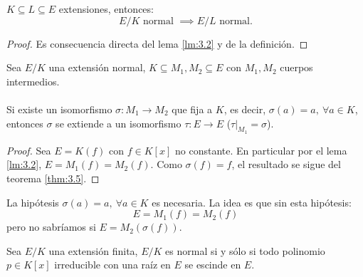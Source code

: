 

\begin{lm}\label{lm:3.7}
    $K \subseteq L \subseteq E$ extensiones, entonces:
    $$
        E/K \text{ normal } \implies E/L \text{ normal.}
    $$
\end{lm}

\begin{proof}
    Es consecuencia directa del lema \ref{lm:3.2} y de la definición.
\end{proof}


\begin{cor}
    Sea $E/K$ una extensión normal, $K \subseteq M_1, M_2 \subseteq E$ con $M_1, M_2$ cuerpos intermedios.\\\\
    Si existe un isomorfismo $\sigma: M_1 \to M_2$ que fija a $K$, es decir, $\sigma(a) = a,\ \forall a \in K$, entonces $\sigma$ se extiende a un isomorfismo $\tau: E \to E$ ($\left. \tau \right|_{M_1} = \sigma$).
\end{cor}
\begin{proof}
    Sea $E = K(f)$ con $f \in K[x]$ no constante. En particular por el lema \ref{lm:3.2}, $E = M_1(f) = M_2(f)$. Como $\sigma(f) = f$, el resultado se sigue del teorema \ref{thm:3.5}.
\end{proof}
\begin{obs}
    La hipótesis $\sigma(a) = a,\ \forall a \in K$ es necesaria. La idea es que sin esta hipótesis:
    $$
        E = M_1(f) = M_2(f)
    $$
    pero no sabríamos si $E = M_2(\sigma(f))$.
\end{obs}

\begin{thm}\label{thm:3.9}
    Sea $E/K$ una extensión finita, $E/K$ es normal si y sólo si todo polinomio $p \in K[x]$ irreducible con una raíz en $E$ se escinde en $E$.
\end{thm}

